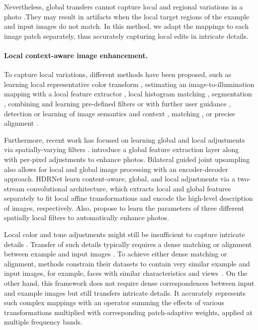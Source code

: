 Nevertheless, global transfers cannot capture local and regional variations in a photo \cite{CohenOr06Color}.They may result in artifacts when the local target regions of the example and input images do not match. In this method, we adapt the mappings to each image patch separately, thus accurately capturing local edits in intricate details.

\paragraph{Local context-aware image enhancement.} 
 To capture local variations, different methods have been proposed, such as learning local representative color transform \cite{kim2021representative}, estimating an image-to-illumination mapping with a local feature extractor \cite{wang2019underexposed}, local histogram matching \cite{Shapira13Image}, segmentation \cite{Laffont14Transient,Tai07Soft}, combining and learning pre-defined filters \cite{Berthouzoz11AFramework,Chen18Deep,Huang14Parametric,Omiya18Learning,Saeedi18Multimodal} or with further user guidance \cite{An10User,Pouli11Progressive,Tai05Local}, detection or learning of image semantics and context \cite{Gharbi17Deep,Hwang12Context,Kaufman12Content,Nam17Deep,Yan14Automatic,Zhu18Automatic}, matching \cite{HaCohen11Nonrigid}, or precise alignment \cite{Kagarlitsky09Piecewise, Shih13Data}. 
 
 Furthermore, recent work has focused on learning global and local adjustments via spatially-varying filters \cite{moran2020deeplpf, Gharbi17Deep, chen2018deep, shaham2021spatially, li2020lapar}. \citeauthor{chen2018deep} \cite{chen2018deep} introduce a global feature extraction layer along with per-pixel adjustments to enhance photos. Bilateral guided joint upsampling \cite{chen2016bilateral} also allows for local and global image processing with an encoder-decoder approach. HDRNet \cite{Gharbi17Deep} learn content-aware, global, and local adjustments via a two-stream convolutional architecture, which extracts local and global features separately to fit local affine transformations and encode the high-level description of images, respectively. Also, \citeauthor{moran2020deeplpf} \cite{moran2020deeplpf} propose to learn the parameters of three different spatially local filters to automatically enhance photos. 

Local color and tone adjustments might still be insufficient to capture intricate details \cite{Bae06Two}. Transfer of such details typically requires a dense matching \cite{HaCohen11Nonrigid} or alignment between example and input images \cite{Shih14Style}. To achieve either dense matching or alignment, methods constrain their datasets to contain very similar example and input images, for example, faces with similar characteristics and views~\cite{Shih14Style}. On the other hand, this framework does not require dense correspondences between input and example images but still transfers intricate details. It accurately represents such complex mappings with an operator summing the effects of various transformations multiplied with corresponding patch-adaptive weights, applied at multiple frequency bands.

